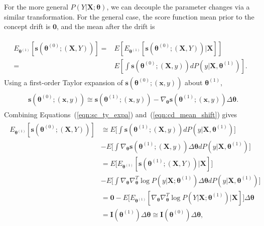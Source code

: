 \documentclass[twoside,11pt]{article}
\begin{document}
For the more general $P(Y|\bm{X};\bm{\theta})$, we can decouple the parameter changes via a similar transformation. For the general case, the score function mean prior to the concept drift is $\bm{0}$, and the mean after the drift is

\begin{align}
\begin{aligned}
E _{\bm { \theta}^{ (1)}}[\bm{s}(\bm { \theta}^{ (0)}; (\bm {X}, Y))] 
= & E[E _{\bm { \theta}^{ (1)}}[\bm{s}(\bm { \theta}^{ (0)}; (\bm {X}, Y))| \bm {X}] ] \\
= & E[\int \bm{s}(\bm { \theta}^{ (0)}; (\bm {X}, y)) dP(y | \bm {X}, \bm{\theta} ^{ (1)})].
\end{aligned}
\label{eqn:cd_mean_shift}
\end{align}
Using a first-order Taylor expansion of $\bm{s}(\bm { \theta}^{ (0)}; (\bm {x}, y))$ about $\bm { \theta} ^{ (1)}$,
\begin{align}
\begin{aligned}
 &\bm{s}(\bm { \theta}^{ (0)}; (\bm {x}, y)) \cong \bm{s}(\bm { \theta}^{ (1)}; (\bm {x}, y)) 
 - \nabla _{\bm { \theta}}{ \bm{s}(\bm { \theta}^{ (1)}; (\bm {x}, y))} \Delta\bm{ \theta}. 
\end{aligned}
\label{eqn:sc_ty_expa}
\end{align}
Combining Equations~(\ref{eqn:sc_ty_expa})  and~(\ref{eqn:cd_mean_shift}) gives
\begin{align}
\begin{aligned}
E _{\bm { \theta}^{ (1)}}[\bm{s}(\bm { \theta}^{ (0)}; (\bm {X}, Y))] & \cong E \big[ \int \bm{s}(\bm { \theta}^{ (1)}; (\bm {X}, y)) dP(y| \bm {X}, \bm{\theta}^{ (1)}) \big] \\ 
 & - E \big[ \int \nabla _{\bm { \theta}}{ \bm{s}(\bm { \theta}^{ (1)}; (\bm {X}, y))} \Delta\bm{ \theta} dP(y| \bm {X}, \bm{\theta}^{ (1)}) \big] \\ 
& = E \big[ E _{\bm { \theta}^{ (1)}}[\bm{s}(\bm { \theta}^{ (1)}; (\bm {X}, Y))| \bm {X}] \big] \\
& - E \big[ \int \nabla_{\bm { \theta}} \nabla^T _{\bm { \theta}}{ \log P(y|\bm{X};\bm { \theta}^{ (1)})} \Delta\bm{ \theta} dP (y| \bm {X}, \bm{\theta}^{ (1)}) \big] \\
& = \bm{0} -  E \big[ E _{\bm { \theta}^{ (1)}}[\nabla_{\bm { \theta}} \nabla ^T_{\bm { \theta}}{ \log{P}(Y|\bm{X};\bm { \theta}^{ (1)})} | \bm {X}] \big] \Delta\bm{ \theta} \\
& = \mathbf {I}(\bm { \theta}^{ (1)}) \Delta\bm{ \theta} \cong \mathbf {I}(\bm { \theta}^{ (0)}) \Delta\bm{ \theta}, \\
\end{aligned}
\label{eqn:cd_decomp_fisher_approx}
\end{align}
\end{document}
